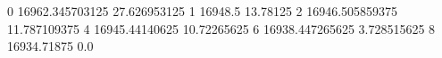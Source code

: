 0 16962.345703125 27.626953125
1 16948.5 13.78125
2 16946.505859375 11.787109375
4 16945.44140625 10.72265625
6 16938.447265625 3.728515625
8 16934.71875 0.0
